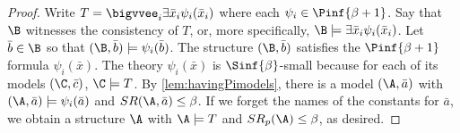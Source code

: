 \documentclass[10pt,a4paper]{amsart}
\renewcommand{\-}{\text{-}}
\begin{document}
\havingSigmamodels

\begin{proof}
Write $T=\bigvvee_{i}\exists \bar x_i\psi_i(\bar x_i)$ where each $\psi_i\in\Pinf{\beta+1}$.
Say that $\B$ witnesses the consistency of $T$, or, more specifically, $\B\models \exists \bar x_i\psi_i(\bar x_i)$.
Let $\bar b\in \B$ so that $(\B,\bar b)\models \psi_i(\bar b)$.
The structure $(\B,\bar b)$ satisfies the $\Pinf{\beta+1}$ formula $\psi_i(\bar x)$.
The theory $\psi_i(\bar x)$ is $\Sinf{\beta}$-small because for each of its models $(\C,\bar{c})$, $\C\models T$.
By \cref{lem:havingPimodels}, there is a model $(\A,\bar a)$ with $(\A,\bar a)\models \psi_i(\bar a)$ and $SR(\A,\bar a)\leq \beta$.
If we forget the names of the constants for $\bar a$, we obtain a structure $\A$ with $\A\models T$ and $SR_p(\A)\leq \beta$, as desired.
\end{proof}
\end{document}
